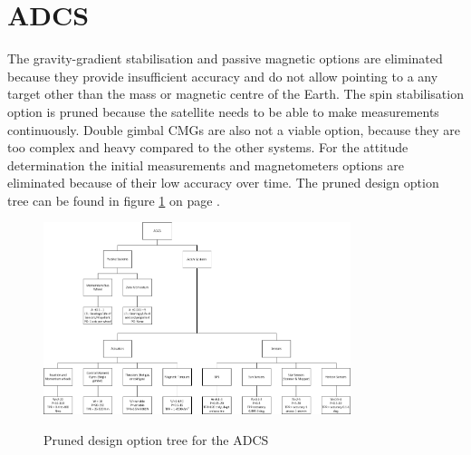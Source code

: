\section{\acl{ADCS}}
\label{pruneADCS}
The gravity-gradient stabilisation and passive magnetic options are eliminated because they provide insufficient accuracy and do not allow pointing to a any target other than the mass or magnetic centre of the Earth. The spin stabilisation option is pruned because the satellite needs to be able to make measurements continuously. Double gimbal \acp{CMG} are also not a viable option, because they are too complex and heavy compared to the other systems.
For the attitude determination the initial measurements and magnetometers options are eliminated because of their low accuracy over time.
The pruned design option tree can be found in figure \ref{fig:pruneADCS} on page \pageref{fig:pruneADCS}.

\begin{figure}
\centering
\includegraphics[width=0.8\textwidth, angle=90]{chapters/img/prunedADCStree.png}
\label{fig:pruneADCS}
\caption{Pruned design option tree for the \ac{ADCS}}
\end{figure}